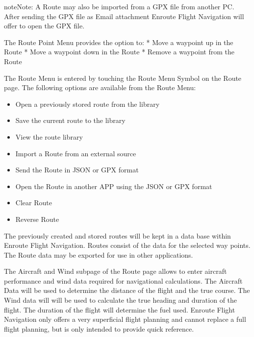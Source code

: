 \documentclass[letterpaper,10pt,english]{sphinxmanual}
\begin{document}
\begin{sphinxadmonition}{note}{Note:}
A Route may also be imported from a GPX file from another PC. After sending the GPX file as Email attachment Enroute Flight Navigation will offer to open the GPX file.
\end{sphinxadmonition}

The Route Point Menu provides the option to:
* Move a waypoint up in the Route
* Move a waypoint down in the Route
* Remove a waypoint from the Route

The Route Menu is entered by touching the Route Menu Symbol on the Route page.
The following options are available from the Route Menu:
\begin{itemize}
\item {} 
Open a previously stored route from the library

\item {} 
Save the current route to the library

\item {} 
View the route library

\item {} 
Import a Route from an external source

\item {} 
Send the Route in JSON or GPX format

\item {} 
Open the Route in another APP using the JSON or GPX format

\item {} 
Clear Route

\item {} 
Reverse Route

\end{itemize}

The previously created and stored routes will be kept in a data base within Enroute Flight Navigation. Routes consist of the data for the selected way points. The Route data may be exported for use in other applications.


The Aircraft and Wind sub\sphinxhyphen{}page of the Route page allows to enter aircraft performance and wind data required for navigational calculations.
The Aircraft Data will be used to determine the distance of the flight and the true course.
The Wind data will will be used to calculate the true heading and duration of the flight. The duration of the flight will determine the fuel used.
Enroute Flight Navigation only offers a very superficial flight planning and cannot replace a full flight planning, but is only intended to provide quick reference.
\end{document}

